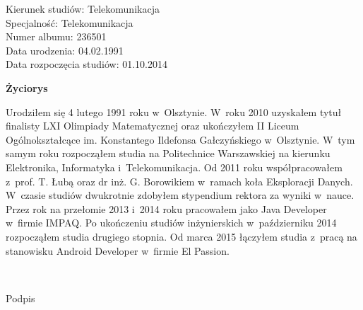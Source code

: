 	\newpage
	\thispagestyle{empty}

\begin{flushright}

  \begin{varwidth}[t]{\textwidth}
	Kierunek studiów: Telekomunikacja\\
	Specjalność: Telekomunikacja \\
	Numer albumu: 236501\\
	Data urodzenia: 04.02.1991 \\
	Data rozpoczęcia studiów: 01.10.2014 \\
  \end{varwidth}

\end{flushright}

\begin{center}
    \textbf{\textbf{Życiorys}}
\end{center}

	\vspace{0.5cm}

Urodziłem się 4 lutego 1991 roku w~Olsztynie.
W~roku 2010 uzyskałem tytuł finalisty LXI Olimpiady Matematycznej oraz
ukończyłem II Liceum Ogólnokształcące im. Konstantego Ildefonsa Gałczyńskiego w~Olsztynie.
W~tym samym roku rozpocząłem studia na Politechnice Warszawskiej na kierunku Elektronika, Informatyka i~Telekomunikacja.
Od 2011 roku współpracowałem z~prof. T. Łubą oraz dr inż. G. Borowikiem w~ramach koła Eksploracji Danych.
W~czasie studiów dwukrotnie zdobyłem stypendium rektora za wyniki w~nauce.
Przez rok na przełomie 2013 i~2014 roku pracowałem jako Java Developer w~firmie IMPAQ.
Po ukończeniu studiów inżynierskich w~październiku 2014 rozpocząłem studia drugiego stopnia.
Od marca 2015 łączyłem studia z~pracą na stanowisku Android Developer w~firmie El Passion.

	\vspace{1cm}

\begin{flushright}
	\begin{minipage}{5cm}
		\dotfill \\[-0.7cm]
		\begin{center}
		\small Podpis
		\end{center}
	\end{minipage}
\end{flushright}

	\vspace{2cm}
\cleardoublepage
